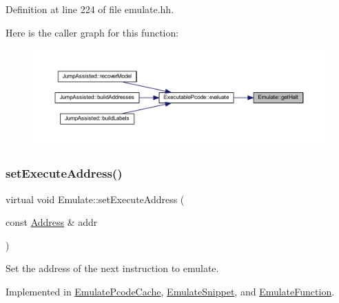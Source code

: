 Definition at line 224 of file emulate.\+hh.

Here is the caller graph for this function\+:
\nopagebreak
\begin{figure}[H]
\begin{center}
\leavevmode
\includegraphics[width=350pt]{class_emulate_ab1f2882dd3554c18c60e817e80f3c4bc_icgraph}
\end{center}
\end{figure}
\mbox{\label{class_emulate_aff5f9779fdad54f853d4e799f5289410}} 
\subsubsection{\texorpdfstring{setExecuteAddress()}{setExecuteAddress()}}
{\footnotesize\ttfamily virtual void Emulate\+::set\+Execute\+Address (\begin{DoxyParamCaption}\item[{const \mbox{\hyperlink{class_address}{Address}} \&}]{addr }\end{DoxyParamCaption})\hspace{0.3cm}{\ttfamily [pure virtual]}}



Set the address of the next instruction to emulate. 



Implemented in \mbox{\hyperlink{class_emulate_pcode_cache_a732fcebcb6aae1a9e7b9e833df6f1e85}{Emulate\+Pcode\+Cache}}, \mbox{\hyperlink{class_emulate_snippet_a22a13101a25f73f33a9b10f20ebf018a}{Emulate\+Snippet}}, and \mbox{\hyperlink{class_emulate_function_abdda883c4bab425f1c060fcc6c867b25}{Emulate\+Function}}.

